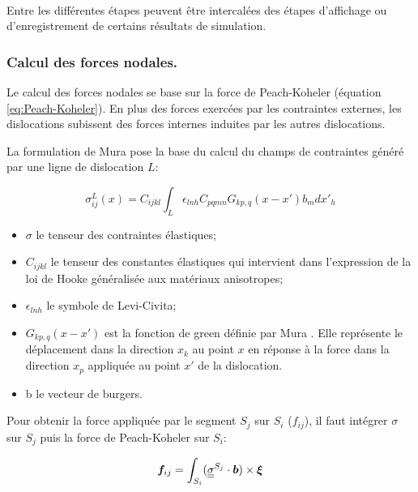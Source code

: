 \documentclass[11pt,class=article,float=false,crop=false]{standalone}
\begin{document}
\paragraph{}
Entre les différentes étapes peuvent être intercalées des étapes d'affichage ou d'enregistrement de certains résultats de simulation.


\subsubsection{Calcul des forces nodales.}
\label{sec:forces_nodales}

Le calcul des forces nodales se base sur la force de Peach-Koheler  (équation \ref{eq:Peach-Koheler}). En plus des forces exercées par les contraintes externes, les dislocations subissent des forces internes induites par les autres dislocations. 

La formulation de Mura  pose la base du calcul du champs de contraintes généré par une ligne de dislocation $L$:

\begin{equation}
\sigma^L_{ij} (x) = C_{ijkl} \int_L \epsilon _{lnh} C_{pqmn} G_{kp,q} (x-x')b_m dx'_h
\end{equation}

\begin{itemize}
	\item $\sigma$ le tenseur des contraintes élastiques;
	\item $C_{ijkl}$ le tenseur des constantes élastiques qui intervient dans l'expression de la loi de Hooke généralisée aux matériaux anisotropes;
	\item $\epsilon _{lnh}$ le symbole de Levi-Civita;
	\item $G_{kp,q} (x-x')$ est la fonction de green définie par Mura . Elle représente le déplacement dans la direction $x_k$ au point $x$ en réponse à la force dans la direction $x_p$ appliquée au point $x'$ de la dislocation. 
	\item b le vecteur de burgers.
\end{itemize}

Pour obtenir la force appliquée par le segment $S_j$ sur $S_i$ ($f_{ij}$), il faut intégrer $\sigma$ sur $S_j$ puis la force de Peach-Koheler sur $S_i$:

\begin{equation}
\bm{f}_{ij} = \int_{S_i} (\underline{\underline{\sigma } }^{S_j} \cdot \bm{b}) \times \bm{\xi}
\end{equation}
\end{document}
